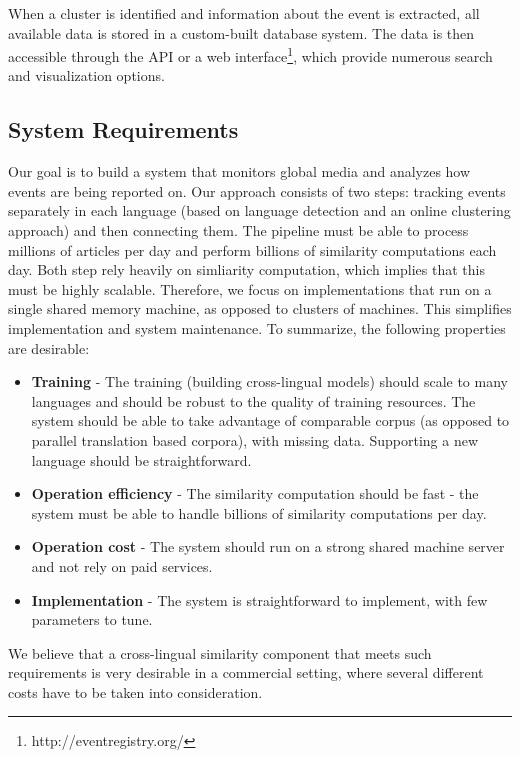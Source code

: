 \documentclass[twoside,11pt]{article}
\begin{document}
When a cluster is identified and information about the event is extracted, all available data is stored in a custom-built database system. The data is then accessible through the API or a web interface\footnote{http://eventregistry.org/}, which provide numerous search and visualization options.


\subsection{System Requirements}
\label{sec:sysreq}

Our goal is to build a system that monitors global media and analyzes how events are being reported on. Our approach consists of two steps: tracking events separately in each language (based on language detection and an online clustering approach) and then connecting them. The pipeline must be able to process millions of articles per day and perform billions of similarity computations each day. Both step rely heavily on simliarity computation, which implies that this must be highly scalable.
%
Therefore, we focus on implementations that run on a single shared memory machine, as opposed to clusters of machines. This  simplifies implementation and system maintenance.
To summarize, the following properties are desirable:
\begin{itemize}
\item \textbf{Training} - The training (building cross-lingual models) should scale to many languages and should be robust to the quality of training resources. The system should be able to take advantage of comparable corpus (as opposed to parallel translation based corpora), with missing data. Supporting a new language should be straightforward.
\item \textbf{Operation efficiency} - The similarity computation should be fast - the system must be able to handle billions of similarity computations per day.
\item \textbf{Operation cost} - The system should run on a strong shared machine server and not rely on paid services.
\item \textbf{Implementation} - The system is straightforward to implement, with few parameters to tune.
\end{itemize}
We believe that a cross-lingual similarity component that meets such requirements is very desirable in a commercial setting, where several different costs have to be taken into consideration.
\end{document}

